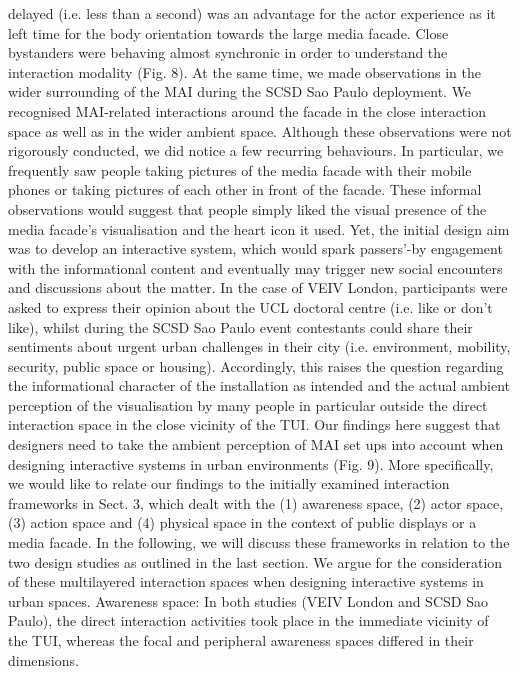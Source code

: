 delayed (i.e. less than a second) was an advantage for the actor experience as it
left time for the body orientation towards the large media facade. Close bystanders
were behaving almost synchronic in order to understand the interaction modality
(Fig. 8).
At the same time, we made observations in the wider surrounding of the MAI
during the SCSD Sao Paulo deployment. We recognised MAI-related interactions
around the facade in the close interaction space as well as in the wider ambient
space. Although these observations were not rigorously conducted, we did notice a few recurring behaviours. In particular, we frequently saw people taking pictures
of the media facade with their mobile phones or taking pictures of each other in
front of the facade. These informal observations would suggest that people simply
liked the visual presence of the media facade’s visualisation and the heart icon it
used. Yet, the initial design aim was to develop an interactive system, which would
spark passers’-by engagement with the informational content and eventually
may trigger new social encounters and discussions about the matter. In the case
of VEIV London, participants were asked to express their opinion about the UCL
doctoral centre (i.e. like or don’t like), whilst during the SCSD Sao Paulo event
contestants could share their sentiments about urgent urban challenges in their
city (i.e. environment, mobility, security, public space or housing). Accordingly,
this raises the question regarding the informational character of the installation as
intended and the actual ambient perception of the visualisation by many people
in particular outside the direct interaction space in the close vicinity of the TUI.
Our findings here suggest that designers need to take the ambient perception of
MAI set ups into account when designing interactive systems in urban environments
(Fig. 9).
More specifically, we would like to relate our findings to the initially examined
interaction frameworks in Sect. 3, which dealt with the (1) awareness space,
(2) actor space, (3) action space and (4) physical space in the context of public
displays or a media facade. In the following, we will discuss these frameworks in
relation to the two design studies as outlined in the last section. We argue for the
consideration of these multilayered interaction spaces when designing interactive
systems in urban spaces.
Awareness space: In both studies (VEIV London and SCSD Sao Paulo),
the direct interaction activities took place in the immediate vicinity of the TUI,
whereas the focal and peripheral awareness spaces differed in their dimensions.
